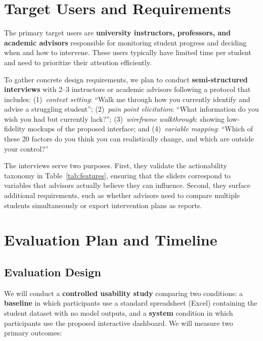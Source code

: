 \documentclass[11pt]{article}
\begin{document}
\section{Target Users and Requirements}
\label{sec:users}

The primary target users are \textbf{university instructors, professors, and academic advisors} responsible for monitoring student progress and deciding when and how to intervene. These users typically have limited time per student and need to prioritize their attention efficiently.

To gather concrete design requirements, we plan to conduct \textbf{semi-structured interviews} with 2--3 instructors or academic advisors following a protocol that includes: (1)~\textit{context setting}: ``Walk me through how you currently identify and advise a struggling student''; (2)~\textit{pain point elicitation}: ``What information do you wish you had but currently lack?''; (3)~\textit{wireframe walkthrough}: showing low-fidelity mockups of the proposed interface; and (4)~\textit{variable mapping}: ``Which of these 20 factors do you think you can realistically change, and which are outside your control?''

The interviews serve two purposes. First, they validate the actionability taxonomy in Table~\ref{tab:features}, ensuring that the sliders correspond to variables that advisors actually believe they can influence. Second, they surface additional requirements, such as whether advisors need to compare multiple students simultaneously or export intervention plans as reports.

\section{Evaluation Plan and Timeline}
\label{sec:evaluation}

\subsection{Evaluation Design}

We will conduct a \textbf{controlled usability study} comparing two conditions: a \textbf{baseline} in which participants use a standard spreadsheet (Excel) containing the student dataset with no model outputs, and a \textbf{system} condition in which participants use the proposed interactive dashboard. We will measure two primary outcomes:
\end{document}
